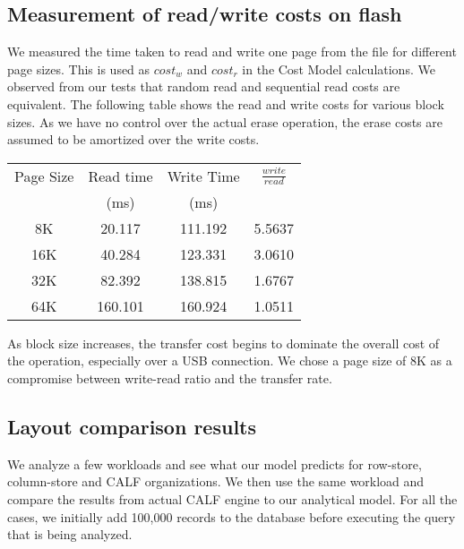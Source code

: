 \documentclass[twocolumn,11pt]{article}
\begin{document}
\subsection{Measurement of read/write costs on flash}

We measured the time taken to read and write one page from the file for
different page sizes. This is used as $cost_w$ and $cost_r$ in the Cost
Model calculations. We observed from our tests that random read and 
sequential read costs are equivalent. The following table shows the read
and write costs for various block sizes. As we have no control over the
actual erase operation, the erase costs are assumed to be amortized
over the write costs.\\

\begin{tabular}{|c|c|c|c|}
\hline
	{\small Page Size} 	& {\small Read time} & {\small Write Time}  & $\frac{write}{read}$\\
						& (ms)				 & (ms)					& \\
\hline
	8K 		  	& 20.117		& 111.192		 & 5.5637 \\
	16K			& 40.284		& 123.331		 & 3.0610 \\
	32K			& 82.392		& 138.815		 & 1.6767 \\
	64K			& 160.101		& 160.924		 & 1.0511 \\
\hline
\end{tabular}

As block size increases, the transfer cost begins to dominate the overall
cost of the operation, especially over a USB connection. We chose a page
size of 8K as a compromise between write-read ratio and the transfer rate.

\subsection{Layout comparison results}

We analyze a few workloads and see what our model predicts for row-store, column-store 
and CALF organizations. We then use the same workload and compare the results from actual 
CALF engine to our analytical model. For all the cases, we initially add 100,000 records 
to the database before executing the query that is being analyzed.

\renewcommand{\labelenumi}{\textbf{Case \arabic{enumi}}}
\end{document}
